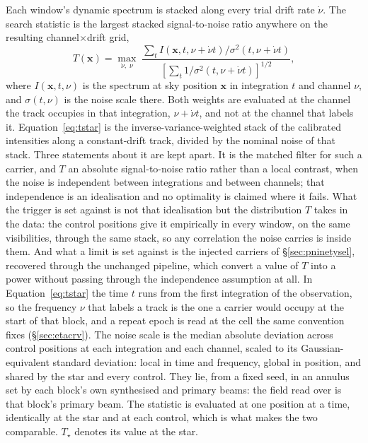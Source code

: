 Each window's dynamic spectrum is stacked along every trial drift rate
$\dot\nu$. The search statistic is the largest stacked signal-to-noise
ratio anywhere on the resulting channel$\times$drift grid,
%
\begin{equation}
T(\mathbf{x})=\max_{\dot\nu,\;\nu}\;
\frac{\sum_{t} I\!\left(\mathbf{x},t,\nu+\dot\nu t\right)
       \big/\sigma^{2}(t,\nu+\dot\nu t)}
     {\left[\sum_{t}1\big/\sigma^{2}(t,\nu+\dot\nu t)\right]^{1/2}},
\label{eq:tstar}
\end{equation}
%
where $I(\mathbf{x},t,\nu)$ is the spectrum at sky position $\mathbf{x}$
in integration $t$ and channel $\nu$, and $\sigma(t,\nu)$ is the noise scale
there. Both weights are evaluated at the channel the track occupies in that
integration, $\nu+\dot\nu t$, and not at the channel that labels it. Equation~\ref{eq:tstar} is the inverse-variance-weighted stack of the
calibrated intensities along a constant-drift track, divided by the nominal
noise of that stack. Three statements about it are kept apart. It is the
matched filter for such a carrier, and $T$ an absolute signal-to-noise ratio
rather than a local contrast, when the noise is independent between
integrations and between channels; that independence is an idealisation and
no optimality is claimed where it fails. What the trigger is set against is
not that idealisation but the distribution $T$ takes in the data: the
\NCtrl{} control positions give it empirically in every window, on the same
visibilities, through the same stack, so any correlation the noise carries
is inside them. And what a limit is set against is the injected carriers of
\S\ref{sec:pninetysel}, recovered through the unchanged pipeline, which
convert a value of $T$ into a power without passing through the
independence assumption at all. In Equation~\ref{eq:tstar} the time $t$ runs from the first integration of the
observation, so the frequency $\nu$ that labels a track is the one a carrier
would occupy at the start of that block, and a repeat epoch is read at the
cell the same convention fixes (\S\ref{sec:etacrv}).
The noise scale is the median absolute deviation
across \NCtrl{} control positions at each integration and each channel,
scaled to its Gaussian-equivalent standard deviation: local in time and
frequency, global in position, and shared by the star and every control.
They lie, from a fixed seed, in an annulus set by each block's own
synthesised and primary beams: the field read over is that block's primary
beam.
The statistic is evaluated at one position at a time, identically at the
star and at each control, which is what makes the two comparable.
$T_\star$ denotes its value at the star.

